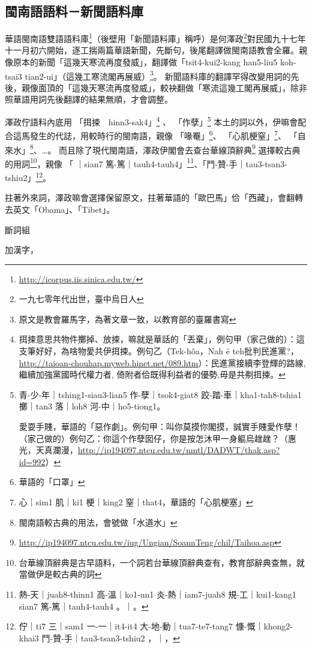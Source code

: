 \subsection{閩南語語料－新聞語料庫}
\label{節：新聞語料庫}
華語閩南語雙語語料庫\footnote{\url{http://icorpus.iis.sinica.edu.tw/}}（後壁用「新聞語料庫」稱呼）是何澤政\footnote{一九七零年代出世，臺中烏日人}對民國九十七年十一月初六開始，逐工揣兩篇華語新聞，先斷句，後尾翻譯做閩南語教會全羅。親像原本的新聞「這幾天寒流再度發威」，翻譯做「tsit4-kui2-kang han5-liu5 koh-tsai3 tian2-ui」（這幾工寒流閣再展威）\footnote{原文是教會羅馬字，為著文章一致，以教育部的臺羅書寫}。
新聞語料庫的翻譯罕得改變用詞的先後，親像面頂的「這幾天寒流再度發威」，較袂翻做「寒流這幾工閣再展威」，除非照華語用詞先後翻譯的結果無順，才會調整。

澤政佇語料內底用
「挕捒　hinn3-sak4」\footnote{挕捒意思共物件擲掉、放捒，嘛就是華話的「丟棄」，例句甲（家己做的）：這支筆好好，為啥物愛共伊挕捒。例句乙（Tek-hôa，Nah ē teh批判民進黨?，\url{http://taioan-chouhap.myweb.hinet.net/089.htm}）：民進黨接續李登輝的路線, 繼續加強黨國時代權力者, 倚附者佮既得利益者的優勢,毋是共刜挕捒。}
、
「作孽」\footnote{
青-少-年｜tshing1-siau3-lian5 作-孽｜tsok4-giat8 跤-踏-車｜kha1-tah8-tshia1 擲｜tan3 落｜loh8 河-中｜ho5-tiong1。

愛耍手賤，華語的「惡作劇」。例句甲：叫你莫摸你閣摸，誠實手賤愛作孽！（家己做的）例句乙：你這个作孽囡仔，你是按怎沐甲一身軀烏趖趖？（惠光，天真瀾漫，\url{http://ip194097.ntcu.edu.tw/nmtl/DADWT/thak.asp?id=992}）}
本土的詞以外，伊嘛會配合這馬發生的代誌，用較時行的閩南語，親像
「喙罨」\footnote{華語的「口罩」}、
「心肌梗窒」\footnote{心｜sim1 肌｜ki1 梗｜king2 窒｜that4，華語的「心肌梗塞」}、
「自來水」\footnote{閩南語較古典的用法，會號做「水道水」}、…。
而且除了現代閩南語，澤政伊閣會去查台華線頂辭典\footnote{\url{http://ip194097.ntcu.edu.tw/iug/Ungian/SoannTeng/chil/Taihoa.asp}}
選擇較古典的用詞\footnote{台華線頂辭典是古早語料，一个詞若台華線頂辭典查有，教育部辭典查無，就當做伊是較古典的詞}，親像
「𤺪｜sian7 篤-篤｜tauh4-tauh4」\footnote{熱-天｜juah8-thinn1 高-溫｜ko1-un1 炎-熱｜iam7-juah8 規-工｜kui1-kang1 𤺪｜sian7 篤-篤｜tauh4-tauh4 。｜。}、「鬥-贊-手｜tau3-tsan3-tshiu2」\footnote{佇｜ti7 三｜sam1 一-一｜it4-it4 大-地-動｜tua7-te7-tang7 慷-慨｜khong2-khai3 鬥-贊-手｜tau3-tsan3-tshiu2 ，｜，}。

拄著外來詞，澤政嘛會選擇保留原文，拄著華語的「歐巴馬」佮「西藏」，會翻轉去英文「Obama」、「Tibet」。

斷詞組

加漢字，

